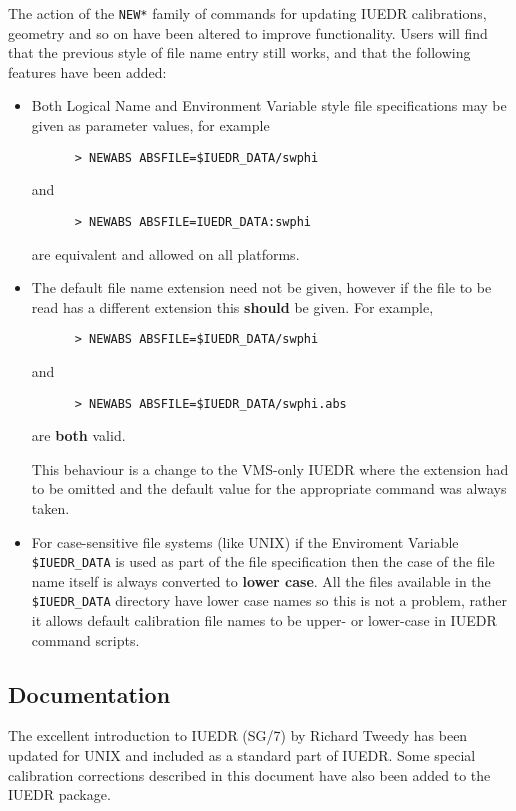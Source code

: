 The action of the \verb+NEW*+ family of commands for updating IUEDR
calibrations, geometry and so on have been altered  to improve functionality.
Users will find that the previous style of file name entry still works,
and that the following features have been added:
\begin{itemize}
   \item Both Logical Name and Environment Variable style file specifications
   may be given as parameter values, for example
   \begin{verbatim}
      > NEWABS ABSFILE=$IUEDR_DATA/swphi
   \end{verbatim}
   and
   \begin{verbatim}
      > NEWABS ABSFILE=IUEDR_DATA:swphi
   \end{verbatim}
   are equivalent and allowed on all platforms.
   \item The default file name extension need not be given, however if the
   file to be read has a different extension this {\bf should} be given.
   For example,
   \begin{verbatim}
      > NEWABS ABSFILE=$IUEDR_DATA/swphi
   \end{verbatim}
   and
   \begin{verbatim}
      > NEWABS ABSFILE=$IUEDR_DATA/swphi.abs
   \end{verbatim}
   are {\bf both} valid.

   This behaviour is a change to the VMS-only IUEDR where the extension had
   to be omitted and the default value for the appropriate command was always
   taken.
   \item For case-sensitive file systems (like UNIX) if the Enviroment Variable
   \verb+$IUEDR_DATA+ is used as part of the file specification then the case
   of the file name itself is always converted to {\bf lower case}.  All the
   files available in the \verb+$IUEDR_DATA+ directory have lower case names
   so this is not a problem, rather it allows default calibration file names
   to be upper- or lower-case in IUEDR command scripts.
\end{itemize}

\subsection{Documentation}

The excellent introduction to IUEDR
(SG/7) by Richard Tweedy has been updated for UNIX and included as a standard
part of IUEDR\@.  Some special calibration corrections described in this
document have also been added to the IUEDR package.


